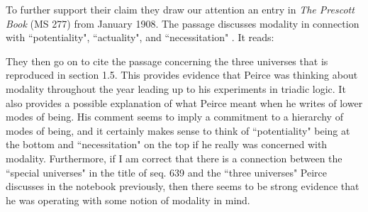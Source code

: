\documentclass[12pt]{article}
\begin{document}
To further support their claim they draw our attention an entry in \textit{The Prescott Book} (MS 277) from January 1908. The passage discusses modality in connection with ``potentiality", ``actuality", and ``necessitation" \citep{fisch1966peirce}. It reads: \begin{singlespace}
\end{singlespace}
\noindent They then go on to cite the passage concerning the three universes that is reproduced in section 1.5. This provides evidence that Peirce was thinking about modality throughout the year leading up to his experiments in triadic logic. It also provides a possible explanation of what Peirce meant when he writes of lower modes of being. His comment seems to imply a commitment to a hierarchy of modes of being, and it certainly makes sense to think of ``potentiality" being at the bottom and ``necessitation" on the top if he really was concerned with modality. Furthermore, if I am correct that there is a connection between the ``special universes" in the title of seq. 639 and the ``three universes" Peirce discusses in the notebook previously, then there seems to be strong evidence that he was operating with some notion of modality in mind.
\end{document}
